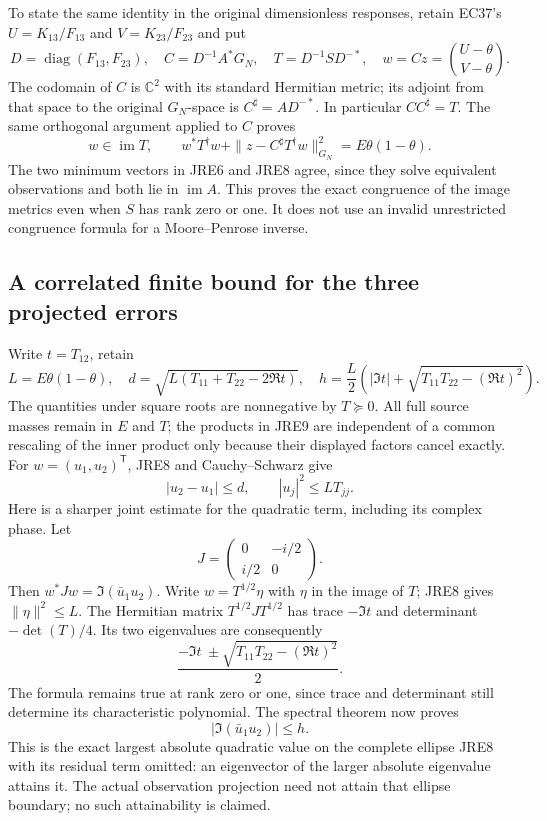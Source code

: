 To state the same identity in the original dimensionless responses,
retain EC37's $U=K_{13}/F_{13}$ and $V=K_{23}/F_{23}$ and put
\[
 D=\operatorname{diag}(F_{13},F_{23}),\quad
 C=D^{-1}A^*G_N,\quad T=D^{-1}S D^{-*},\quad
 w=Cz=\binom{U-\theta}{V-\theta}.                              \tag{JRE7}
\]
The codomain of $C$ is $\mathbb C^2$ with its standard Hermitian
metric; its adjoint from that space to the original $G_N$-space is
$C^\sharp=AD^{-*}$. In particular $CC^\sharp=T$.
The same orthogonal argument applied to $C$ proves
\[
 w\in\operatorname{im}T,\qquad
 w^*T^\dagger w+\|z-C^\sharp T^\dagger w\|_{G_N}^{2}
             =E\theta(1-\theta).                              \tag{JRE8}
\]
The two minimum vectors in JRE6 and JRE8 agree, since they solve
equivalent observations and both lie in $\operatorname{im}A$.
This proves the exact congruence of the image metrics even when
$S$ has rank zero or one. It does not use an invalid unrestricted
congruence formula for a Moore--Penrose inverse.

\subsection{A correlated finite bound for the three projected errors}
Write $t=T_{12}$, retain
\[
 L=E\theta(1-\theta),\quad
 d=\sqrt{L(T_{11}+T_{22}-2\Re t)},\quad
 h=\frac L2\left(|\Im t|+
                   \sqrt{T_{11}T_{22}-(\Re t)^2}\right).       \tag{JRE9}
\]
The quantities under square roots are nonnegative by $T\succeq0$.
All full source masses remain in $E$ and $T$; the products in JRE9
are independent of a common rescaling of the inner product only
because their displayed factors cancel exactly.
For $w=(u_1,u_2)^\mathsf T$, JRE8 and Cauchy--Schwarz give
\[
 |u_2-u_1|\le d,\qquad
 |u_j|^2\le L T_{jj}.                                        \tag{JRE10}
\]
Here is a sharper joint estimate for the quadratic term, including
its complex phase. Let
\[
 J=\begin{pmatrix}0&-i/2\\i/2&0\end{pmatrix}.
\]
Then $w^*Jw=\Im(\bar u_1u_2)$.
Write $w=T^{1/2}\eta$ with $\eta$ in the image of $T$;
JRE8 gives $\|\eta\|^2\le L$. The Hermitian matrix
$T^{1/2}JT^{1/2}$ has trace $-\Im t$ and determinant
$-\det(T)/4$. Its two eigenvalues are consequently
\[
 \frac{-\Im t\ \pm\sqrt{T_{11}T_{22}-(\Re t)^2}}2 .           \tag{JRE11}
\]
The formula remains true at rank zero or one, since trace and
determinant still determine its characteristic polynomial.
The spectral theorem now proves
\[
 |\Im(\bar u_1u_2)|\le h.                                   \tag{JRE12}
\]
This is the exact largest absolute quadratic value on the complete
ellipse JRE8 with its residual term omitted: an eigenvector of the
larger absolute eigenvalue attains it. The actual observation projection
need not attain that ellipse boundary; no such attainability is claimed.

